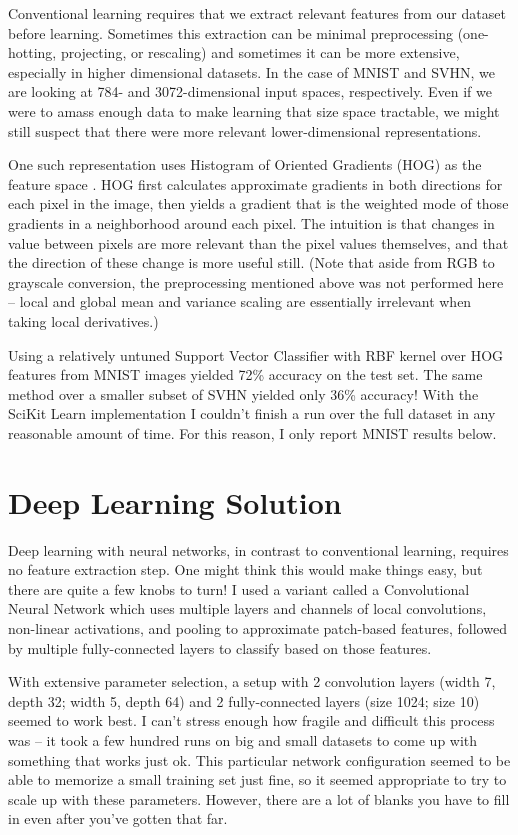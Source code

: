 \documentclass{article}
\begin{document}
Conventional learning requires that we extract relevant features from our dataset before learning. Sometimes this extraction can be minimal preprocessing (one-hotting, projecting, or rescaling) and sometimes it can be more extensive, especially in higher dimensional datasets. In the case of MNIST and SVHN, we are looking at 784- and 3072-dimensional input spaces, respectively. Even if we were to amass enough data to make learning that size space tractable, we might still suspect that there were more relevant lower-dimensional representations.

One such representation uses Histogram of Oriented Gradients (HOG) as the feature space \cite{netzer2011reading}.  HOG first calculates approximate gradients in both directions for each pixel in the image, then yields a gradient that is the weighted mode of those gradients in a neighborhood around each pixel. The intuition is that changes in value between pixels are more relevant than the pixel values themselves, and that the direction of these change is more useful still.  (Note that aside from RGB to grayscale conversion, the preprocessing mentioned above was not performed here -- local and global mean and variance scaling are essentially irrelevant when taking local derivatives.)

Using a relatively untuned Support Vector Classifier with RBF kernel over HOG features from MNIST images yielded 72\% accuracy on the test set. The same method over a smaller subset of SVHN yielded only 36\% accuracy! With the SciKit Learn implementation I couldn't finish a run over the full dataset in any reasonable amount of time. For this reason, I only report MNIST results below.

\section{Deep Learning Solution}

Deep learning with neural networks, in contrast to conventional learning, requires no feature extraction step. One might think this would make things easy, but there are quite a few knobs to turn! I used a variant called a Convolutional Neural Network which uses multiple layers and channels of local convolutions, non-linear activations, and pooling to approximate patch-based features, followed by multiple fully-connected layers to classify based on those features.

With extensive parameter selection, a setup with 2 convolution layers (width 7, depth 32; width 5, depth 64) and 2 fully-connected layers (size 1024; size 10) seemed to work best. I can't stress enough how fragile and difficult this process was -- it took a few hundred runs on big and small datasets to come up with something that works just ok. This particular network configuration seemed to be able to memorize a small training set just fine, so it seemed appropriate to try to scale up with these parameters. However, there are a lot of blanks you have to fill in even after you've gotten that far.
\end{document}
